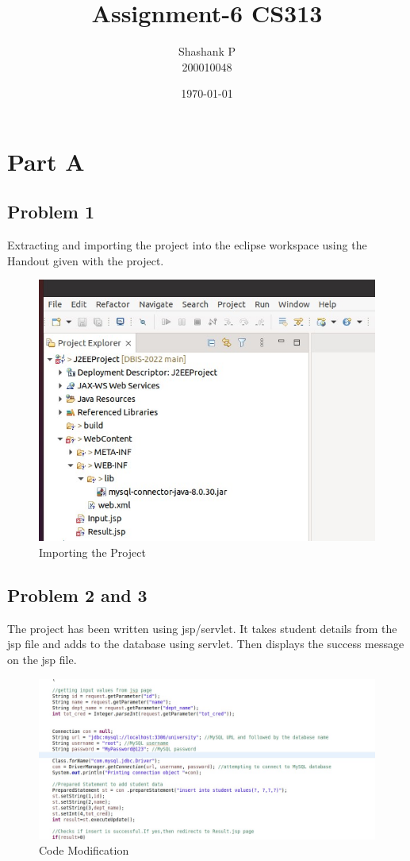 \documentclass{article}
\title{Assignment-6 CS313}
\author{Shashank P \\ 200010048}
\date{\today}
\begin{document}
\maketitle




\section{Part A}
\subsection{Problem 1}
Extracting and importing the project
into the eclipse workspace using the Handout given with the project.
\begin{figure}[!ht]
  \begin{center}
    \includegraphics[scale=0.8]{A_1.jpg}
  \caption{Importing the Project}
  \end{center}
\end{figure}

\newpage
\subsection{Problem 2 and 3}
The project has been written using jsp/servlet. It takes student details from the jsp file and adds to
the database using servlet. Then displays the success message on the jsp file.
\begin{figure}[!ht]
  \begin{center}
    \includegraphics[scale=0.7]{A_2.jpg}
  \caption{Code Modification}
  \end{center}
\end{figure}
\end{document}
